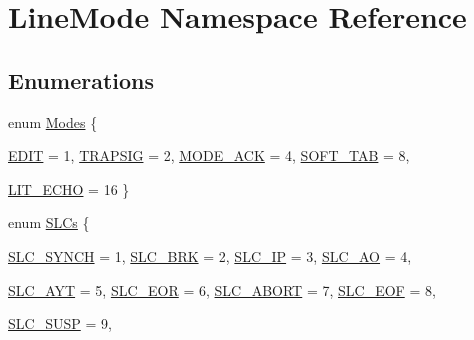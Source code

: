 \hypertarget{namespaceLineMode}{
\section{LineMode Namespace Reference}
\label{namespaceLineMode}
}
\subsection*{Enumerations}
\begin{DoxyCompactItemize}
\item 
enum \hyperlink{namespaceLineMode_a8bca40d5c4a09d910bd71dd1be47c99b}{Modes} \{ \par
\hyperlink{namespaceLineMode_a8bca40d5c4a09d910bd71dd1be47c99baece3f6b606cb967d0414dc1980b37c9b}{EDIT} =  1, 
\hyperlink{namespaceLineMode_a8bca40d5c4a09d910bd71dd1be47c99ba9efcd58065aebde6524edcb6299fc4d9}{TRAPSIG} =  2, 
\hyperlink{namespaceLineMode_a8bca40d5c4a09d910bd71dd1be47c99bafe03b145df35c51cf2224a52de728f43}{MODE\_\-ACK} =  4, 
\hyperlink{namespaceLineMode_a8bca40d5c4a09d910bd71dd1be47c99ba9142db5da2ddd6e8f080a1321bb911ef}{SOFT\_\-TAB} =  8, 
\par
\hyperlink{namespaceLineMode_a8bca40d5c4a09d910bd71dd1be47c99ba7d61f0c041e6395ce0c490b5a11ca1f0}{LIT\_\-ECHO} =  16
 \}
\item 
enum \hyperlink{namespaceLineMode_abebf06755a3b54a53f1f650f5be54e3b}{SLCs} \{ \par
\hyperlink{namespaceLineMode_abebf06755a3b54a53f1f650f5be54e3bacaede46e509d60fb46a394bdb4876a07}{SLC\_\-SYNCH} =  1, 
\hyperlink{namespaceLineMode_abebf06755a3b54a53f1f650f5be54e3bac5ec05632305fa8f085e0fa149e5e04c}{SLC\_\-BRK} =  2, 
\hyperlink{namespaceLineMode_abebf06755a3b54a53f1f650f5be54e3ba7d40550439b51b2e68d6376af40a484c}{SLC\_\-IP} =  3, 
\hyperlink{namespaceLineMode_abebf06755a3b54a53f1f650f5be54e3ba250aa4d28a833ed4ff661920c3f0df73}{SLC\_\-AO} =  4, 
\par
\hyperlink{namespaceLineMode_abebf06755a3b54a53f1f650f5be54e3ba9aad10aed50d5bf45a1819c892d46e73}{SLC\_\-AYT} =  5, 
\hyperlink{namespaceLineMode_abebf06755a3b54a53f1f650f5be54e3bad5cd7138bf3c21b835424aa104d6aa07}{SLC\_\-EOR} =  6, 
\hyperlink{namespaceLineMode_abebf06755a3b54a53f1f650f5be54e3badd2eb0c4675b402242c0a1b440b2c95e}{SLC\_\-ABORT} =  7, 
\hyperlink{namespaceLineMode_abebf06755a3b54a53f1f650f5be54e3ba8bfda4344e6c7fa1e6c49244578bcd4e}{SLC\_\-EOF} =  8, 
\par
\hyperlink{namespaceLineMode_abebf06755a3b54a53f1f650f5be54e3ba1cfcd4fa2af68b1fff28bd976ba5831b}{SLC\_\-SUSP} =  9, 

\end{DoxyCompactItemize}
